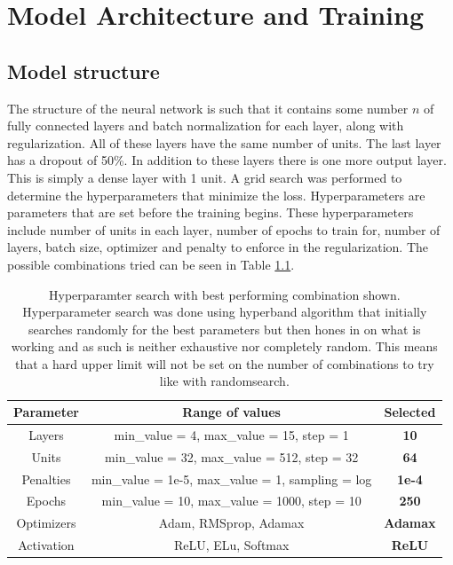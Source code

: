 
\chapter{Model Architecture and Training}

\label{Chapter4}

\section{Model structure}
The structure of the neural network is such that it contains some number $n$ of fully connected layers and batch normalization for each layer, along with regularization. All of these layers have the same number of units. The last layer has a dropout of 50\%. In addition to these layers there is one more output layer. This is simply a dense layer with 1 unit. A grid search was performed to determine the hyperparameters that minimize the loss. Hyperparameters are parameters that are set before the training begins\cite{hyperparameters_definition}. These hyperparameters include number of units in each layer, number of epochs to train for, number of layers, batch size, optimizer and penalty to enforce in the regularization. The possible combinations tried can be seen in Table \ref{table:gridSearchHyperparamters}.

\begin{table}[h]
    \centering
    \caption[Hyperparameter search with best performing combination.]{Hyperparamter search with best performing combination shown. Hyperparameter search was done using hyperband algorithm that initially searches randomly for the best parameters but then hones in on what is working and as such is neither exhaustive nor completely random. This means that a hard upper limit will not be set on the number of combinations to try like with randomsearch.}
    \label{table:gridSearchHyperparamters}
    \begin{tabular}{ccc}
        \toprule
        Parameter & Range of values & Selected\\
        \midrule
        Layers &  min\_value = 4, max\_value = 15, step = 1 & \textbf{10}\\
        Units &  min\_value = 32, max\_value = 512, step = 32 & \textbf{64}\\
        Penalties & min\_value = 1e-5, max\_value = 1, sampling = log & \textbf{1e-4}\\
        Epochs & min\_value = 10, max\_value = 1000, step = 10 & \textbf{250}\\
        Optimizers & Adam, RMSprop, Adamax & \textbf{Adamax}\\
        Activation & ReLU, ELu, Softmax & \textbf{ReLU}\\
        \bottomrule
    \end{tabular}
\end{table}

